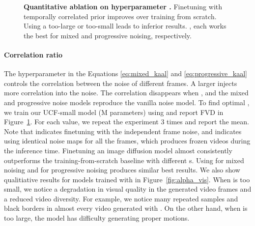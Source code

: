 \documentclass[10pt,twocolumn,letterpaper]{article}
\newcommand{\plothh}{}\newcommand{\plothc}{}\newcommand{\plotvv}{}
\newcommand{\tickYtopD}[1]{\raisebox{-1.5ex}[0ex][0ex]{#1}}
\newcommand{\tickFVD}{\tickYtopD{FVD}}
\newcommand{\new}[1]{#1}
\begin{document}
\vspace{-2mm}
\renewcommand{\plothh}{90mm}
\renewcommand{\plothc}{85mm}
\renewcommand{\plotvv}{50mm}
\begin{figure}[t!]
    \centering
\scriptsize
    \caption{\textbf{Quantitative ablation on hyperparameter .} Finetuning with temporally correlated prior improves over training from scratch. Using a too-large or too-small  leads to inferior results. ,  each works the best for mixed and progressive noising, respectively.}
    \label{fig:sweep_alpha}
\end{figure} 
\paragraph{Correlation ratio} The hyperparameter  in the Equations \ref{eq:mixed_kaal} and \ref{eq:progressive_kaal} controls the correlation between the noise of different frames. A larger  injects more correlation into the noise. The correlation disappears when , and the mixed and progressive noise models reproduce the vanilla noise model. 
To find optimal , we train our UCF-small model (M parameters) using  and report FVD in Figure~\ref{fig:sweep_alpha}. 
For each  value, we repeat the experiment 3 times and report the mean. Note that  indicates finetuning with the independent frame noise, and  indicates using identical noise maps for all the frames, which produces frozen videos during the inference time. Finetuning an image diffusion model almost consistently outperforms the training-from-scratch baseline with different s. Using  for mixed noising and  for progressive noising produces similar best results. \new{We also show qualitiative results for models trained with  in Figure~\ref{fig:alpha_vis}. When  is too small, we notice a degradation in visual quality in the generated video frames and a reduced video diversity. For example, we notice many repeated samples and black borders in almost every video generated with . On the other hand, when  is too large, the model has difficulty generating proper motions.}
\end{document}
